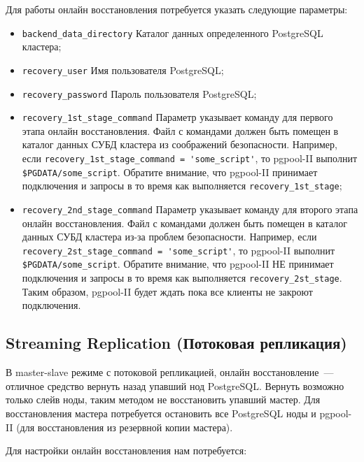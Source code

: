 Для работы онлайн восстановления потребуется указать следующие параметры:

\begin{itemize}

  \item \lstinline!backend_data_directory! Каталог данных определенного PostgreSQL кластера;
  \item \lstinline!recovery_user! Имя пользователя PostgreSQL;
  \item \lstinline!recovery_password! Пароль пользователя PostgreSQL;
  \item \lstinline!recovery_1st_stage_command! Параметр указывает команду для первого этапа онлайн восстановления. Файл с командами должен быть помещен в каталог данных СУБД кластера из соображений безопасности. Например, если \lstinline!recovery_1st_stage_command = 'some_script'!, то pgpool-II выполнит \lstinline!$PGDATA/some_script!. Обратите внимание, что pgpool-II принимает подключения и запросы в то время как выполняется \lstinline!recovery_1st_stage!;
  \item \lstinline!recovery_2nd_stage_command! Параметр указывает команду для второго этапа онлайн восстановления. Файл с командами должен быть помещен в каталог данных СУБД кластера из-за проблем безопасности. Например, если \lstinline!recovery_2st_stage_command = 'some_script'!, то pgpool-II выполнит \lstinline!$PGDATA/some_script!. Обратите внимание, что pgpool-II НЕ принимает подключения и запросы в то время как выполняется \lstinline!recovery_2st_stage!. Таким образом, pgpool-II будет ждать пока все клиенты не закроют подключения.

\end{itemize}


\subsection{Streaming Replication (Потоковая репликация)}

В master-slave режиме с потоковой репликацией, онлайн восстановление~--- отличное средство вернуть назад упавший нод PostgreSQL. Вернуть возможно только слейв ноды, таким методом не восстановить упавший мастер. Для восстановления мастера потребуется остановить все PostgreSQL ноды и pgpool-II (для восстановления из резервной копии мастера).

Для настройки онлайн восстановления нам потребуется:

